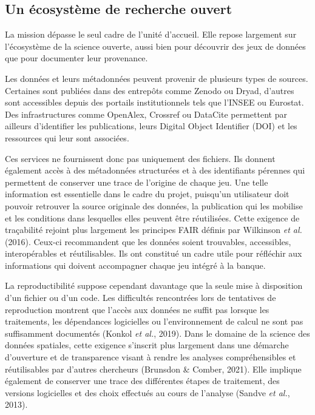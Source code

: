 \documentclass[11pt,a4paper]{article}
\begin{document}
\subsection{Un écosystème de recherche ouvert}

La mission dépasse le seul cadre de l'unité d'accueil. Elle repose largement sur l'écosystème de la science ouverte, aussi bien pour découvrir des jeux de données que pour documenter leur provenance.

Les données et leurs métadonnées peuvent provenir de plusieurs types de sources. Certaines sont publiées dans des entrepôts comme Zenodo ou Dryad, d'autres sont accessibles depuis des portails institutionnels tels que l'INSEE ou Eurostat. Des infrastructures comme OpenAlex, Crossref ou DataCite permettent par ailleurs d'identifier les publications, leurs Digital Object Identifier (DOI) et les ressources qui leur sont associées.

Ces services ne fournissent donc pas uniquement des fichiers. Ils donnent également accès à des métadonnées structurées et à des identifiants pérennes qui permettent de conserver une trace de l'origine de chaque jeu. Une telle information est essentielle dans le cadre du projet, puisqu'un utilisateur doit pouvoir retrouver la source originale des données, la publication qui les mobilise et les conditions dans lesquelles elles peuvent être réutilisées. Cette exigence de traçabilité rejoint plus largement les principes FAIR définis par Wilkinson \textit{et al.} (2016). Ceux-ci recommandent que les données soient trouvables, accessibles, interopérables et réutilisables. Ils ont constitué un cadre utile pour réfléchir aux informations qui doivent accompagner chaque jeu intégré à la banque.

La reproductibilité suppose cependant davantage que la seule mise à disposition d'un fichier ou d'un code. Les difficultés rencontrées lors de tentatives de reproduction montrent que l'accès aux données ne suffit pas lorsque les traitements, les dépendances logicielles ou l'environnement de calcul ne sont pas suffisamment documentés (Konkol \textit{et al.}, 2019). Dans le domaine de la science des données spatiales, cette exigence s'inscrit plus largement dans une démarche d'ouverture et de transparence visant à rendre les analyses compréhensibles et réutilisables par d'autres chercheurs (Brunsdon \& Comber, 2021). Elle implique également de conserver une trace des différentes étapes de traitement, des versions logicielles et des choix effectués au cours de l'analyse (Sandve \textit{et al.}, 2013).
\end{document}
